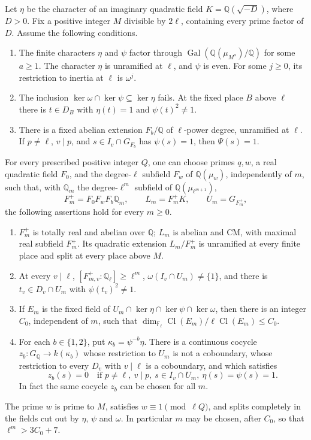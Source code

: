 \begin{theorem}
\label{thm:support-auxiliary-tower}
Let $\eta$ be the character of an imaginary quadratic field
$K=\mathbb Q(\sqrt{-D})$, where $D>0$.  Fix a positive integer
$M$ divisible by $2\ell$, containing every prime factor of $D$.
Assume the following conditions.
\begin{enumerate}
\item The finite characters $\eta$ and $\psi$ factor through
  $\operatorname{Gal}(\mathbb Q(\mu_{M^a})/\mathbb Q)$ for some
  $a\geq1$.  The character $\eta$ is unramified at $\ell$, and
  $\psi$ is even.  For some $j\geq0$, its restriction to inertia
  at $\ell$ is $\omega^j$.
\item The inclusion $\ker\omega\cap\ker\psi\subseteq\ker\eta$
  fails.  At the fixed place $B$ above $\ell$ there is
  $t\in D_B$ with $\eta(t)=1$ and $\psi(t)^2\ne1$.
\item There is a fixed abelian extension $F_b/\mathbb Q$ of
  $\ell$-power degree, unramified at $\ell$.  If $p\ne\ell$,
  $v\mid p$, and $s\in I_v\cap G_{F_b}$ has $\psi(s)=1$,
  then $\Psi(s)=1$.
\end{enumerate}
For every prescribed positive integer $Q$, one can choose primes
$q,w$, a real quadratic field $F_0$, and the degree-$\ell$
subfield $F_w$ of $\mathbb Q(\mu_w)$, independently of $m$, such
that, with $\mathbb Q_m$ the degree-$\ell^m$ subfield of
$\mathbb Q(\mu_{\ell^{m+1}})$,
\[
 F_m^+=F_0F_wF_b\mathbb Q_m,\qquad
 L_m=F_m^+K,\qquad U_m=G_{F_m^+},                         \tag{AT1}
\]
the following assertions hold for every $m\geq0$.
\begin{enumerate}
\item $F_m^+$ is totally real and abelian over $\mathbb Q$;
  $L_m$ is abelian and CM, with maximal real subfield $F_m^+$.
  Its quadratic extension $L_m/F_m^+$ is unramified at every
  finite place and split at every place above $M$.
\item At every $v\mid\ell$,
  $[F_{m,v}^+:\mathbb Q_\ell]\geq\ell^m$,
  $\omega(I_v\cap U_m)\ne\{1\}$, and there is
  $t_v\in D_v\cap U_m$ with $\psi(t_v)^2\ne1$.
\item If $E_m$ is the fixed field of
  $U_m\cap\ker\eta\cap\ker\psi\cap\ker\omega$, then
  there is an integer $C_0$, independent of $m$, such that
  $\dim_{\mathbb F_\ell}\operatorname{Cl}(E_m)/
       \ell\operatorname{Cl}(E_m)\leq C_0$.
\item For each $b\in\{1,2\}$, put $\kappa_b=\psi^{-b}\eta$.
  There is a continuous cocycle $z_b:G_{\mathbb Q}\to k(\kappa_b)$
  whose restriction to $U_m$ is not a coboundary, whose
  restriction to every $D_v$ with $v\mid\ell$ is a coboundary,
  and which satisfies
  \[
   z_b(s)=0\quad\text{if }p\ne\ell,\ v\mid p,
   \ s\in I_v\cap U_m,\ \eta(s)=\psi(s)=1.               \tag{AT2}
  \]
  In fact the same cocycle $z_b$ can be chosen for all $m$.
\end{enumerate}
The prime $w$ is prime to $M$, satisfies $w\equiv1\pmod{\ell Q}$,
and splits completely in the fields cut out by $\eta$, $\psi$
and $\omega$.  In particular $m$ may be chosen, after $C_0$,
so that $\ell^m>3C_0+7$.
\end{theorem}

